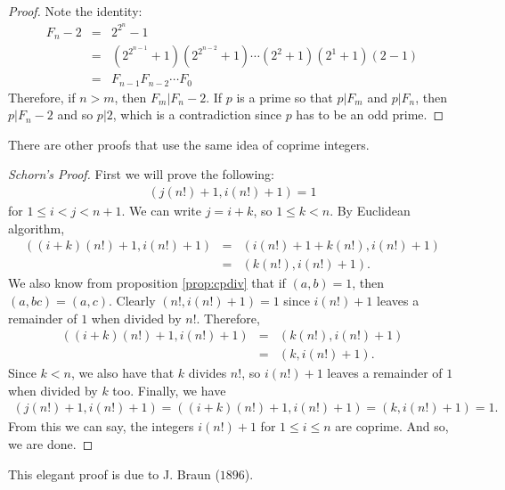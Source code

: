 \documentclass{subfiles}
\begin{document}
	\begin{proof}
		Note the identity:
		\begin{eqnarray*}
			F_n-2 & = & 2^{2^n}-1\\
			& = & \left(2^{2^{n-1}}+1\right)\left(2^{2^{n-2}}+1\right)\cdots\left(2^2+1\right)(2^1+1)(2-1)\\
			& = & F_{n-1}F_{n-2}\cdots F_{0}
		\end{eqnarray*}
		Therefore, if $n>m$, then $F_m|F_n-2$. If $p$ is a prime so that $p|F_m$ and $p|F_n$, then $p|F_n-2$ and so $p|2$, which is a contradiction since $p$ has to be an odd prime.
	\end{proof}
	There are other proofs that use the same idea of coprime integers.
	\begin{proof}[Schorn's Proof]
		First we will prove the following:
		\begin{align*}
			(j(n!)+1,i(n!)+1)=1
		\end{align*}
		for $1\leq i<j<n+1$. We can write $j=i+k$, so $1\leq k<n$. By Euclidean algorithm,
		\begin{eqnarray*}
			((i+k)(n!)+1,i(n!)+1) & = & (i(n!)+1+k(n!),i(n!)+1)\\
			& = & (k(n!),i(n!)+1).
		\end{eqnarray*}
		We also know from proposition \eqref{prop:cpdiv} that if $(a,b)=1$, then $(a,bc)=(a,c)$. Clearly $(n!,i(n!)+1)=1$ since $i(n!)+1$ leaves a remainder of $1$ when divided by $n!$. Therefore,
		\begin{eqnarray*}
			((i+k)(n!)+1,i(n!)+1) & = & (k(n!),i(n!)+1)\\
			& = & (k,i(n!)+1).
		\end{eqnarray*}
		Since $k<n$, we also have that $k$ divides $n!$, so $i(n!)+1$ leaves a remainder of $1$ when divided by $k$ too. Finally, we have 
		\begin{eqnarray*}
			(j(n!)+1,i(n!)+1) = ((i+k)(n!)+1,i(n!)+1) = (k,i(n!)+1) = 1.
		\end{eqnarray*}
		From this we can say, the integers $i(n!)+1$ for $1\leq i\leq n$ are coprime. And so, we are done.
	\end{proof}
	This elegant proof is due to J. Braun ($1896$).
\end{document}
